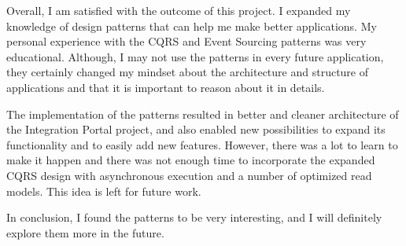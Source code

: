 \documentclass{book}
\begin{document}
Overall, I am satisfied with the outcome of this project. I expanded my
knowledge of design patterns that can help me make better applications.
My personal experience with the CQRS and Event Sourcing patterns was
very educational. Although, I may not use the patterns in every future
application, they certainly changed my mindset about the architecture
and structure of applications and that it is important to reason about
it in details.

The implementation of the patterns resulted in better and cleaner
architecture of the Integration Portal project, and also enabled new
possibilities to expand its functionality and to easily add new
features. However, there was a lot to learn to make it happen and there
was not enough time to incorporate the expanded CQRS design with
asynchronous execution and a number of optimized read models. This idea
is left for future work.

In conclusion, I found the patterns to be very interesting, and I will
definitely explore them more in the future.



\end{document}
